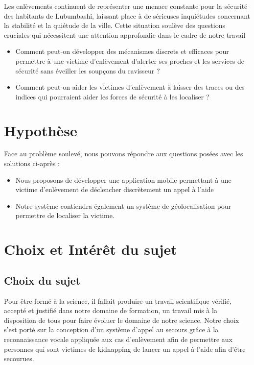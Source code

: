 Les enlèvements continuent de représenter une menace constante pour la sécurité des habitants de Lubumbashi, laissant place à de sérieuses inquiétudes concernant la stabilité et la quiétude de la ville.
Cette situation soulève des questions cruciales qui nécessitent une attention approfondie dans le cadre de notre travail

\begin{itemize}
	\item Comment peut-on développer des mécanismes discrets et efficaces pour permettre à une victime d'enlèvement d'alerter ses proches et les services de sécurité sans éveiller les soupçons du ravisseur ? 
	
	\item Comment peut-on aider les victimes d'enlèvement à laisser des traces ou des indices qui pourraient aider les forces de sécurité à les localiser ?
	
\end{itemize}

\section{Hypothèse}
Face au problème soulevé, nous pouvons répondre aux questions posées avec les solutions ci-après :

\begin{itemize}
\item Nous proposons de développer une application mobile permettant à une victime d'enlèvement de déclencher discrètement un appel à l'aide

\item Notre système contiendra également un système de géolocalisation pour permettre de localiser la victime.

\end{itemize}

\section{Choix et Intérêt du sujet}

\subsection{Choix du sujet}

Pour être formé à la science, il fallait produire un travail scientifique vérifié, accepté et justifié dans notre domaine de formation, un travail mis à la disposition de tous pour faire évoluer le domaine de notre science. Notre choix s'est porté sur la conception d'un système d’appel au secours grâce à la reconnaissance vocale appliquée aux cas d'enlèvement afin de permettre aux personnes qui sont victimes de kidnapping de lancer un appel à l'aide afin d'être secourues.

